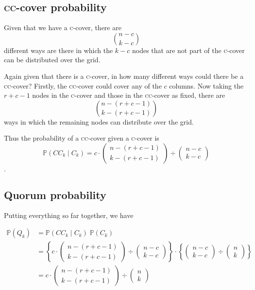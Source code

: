 \documentclass[10pt]{scrartcl}
\begin{document}
\subsection{\textsc{cc}-cover probability}

Given that we have a \textsc{c}-cover, there are \[\binom{n-c}{k-c}\] different ways are there in which the \(k - c \) nodes that are not part of the \textsc{c}-cover can be distributed over the grid.

Again given that there is a \textsc{c}-cover, in how many different ways could there be a \textsc{cc}-cover? Firstly, the \textsc{cc}-cover could cover any of the \(c\) columns. Now taking the \(r+c-1\) nodes in the \textsc{c}-cover and those in the \textsc{cc}-cover as fixed, there are \[\binom{n-(r+c-1)}{k-(r+c-1)}\] ways in which the remaining nodes can distribute over the grid.

Thus the probability of a \textsc{cc}-cover given a \textsc{c}-cover is \[\mathbb{P}(CC_k\;|\;C_k) = {c \cdot \begin{pmatrix}n-(r+c-1) \\ k-(r+c-1)\end{pmatrix}} \div {\begin{pmatrix}n-c \\ k-c\end{pmatrix}}\].

\subsection{Quorum probability}

Putting everything so far together, we have

\begin{align*}
\mathbb{P}(Q_k) &= \mathbb{P}(CC_k\;|\;C_k)\;\mathbb{P}(C_k) \\
                &= \left\{{c \cdot \begin{pmatrix}n-(r+c-1) \\ k-(r+c-1)\end{pmatrix}} \div {\begin{pmatrix}n-c \\ k-c\end{pmatrix}}\right\} \cdot \left\{{\begin{pmatrix}n-c \\ k-c\end{pmatrix}} \div {\begin{pmatrix}n \\ k\end{pmatrix}}\right\} \\
                &= {c \cdot \begin{pmatrix}n-(r+c-1) \\ k-(r+c-1)\end{pmatrix}} \div {\begin{pmatrix}n \\ k\end{pmatrix}}
\end{align*}
\end{document}

